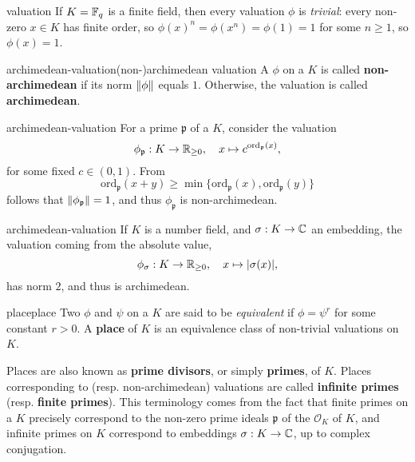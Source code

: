 \begin{example}{valuation}
    If $K = \mathbb{F}_q$ is a finite field, then every valuation $\phi$ is \textit{trivial}: every non-zero $x \in K$ has finite order, so $\phi(x)^n = \phi(x^n) = \phi(1) = 1$ for some $n \ge 1$, so $\phi(x) = 1$.
\end{example}

\begin{topic}{archimedean-valuation}{(non-)archimedean valuation}
    A  $\phi$ on a  $K$ is called \textbf{non-archimedean} if its norm $\left\|\phi\right\|$ equals $1$. Otherwise, the valuation is called \textbf{archimedean}.
\end{topic}

\begin{example}{archimedean-valuation}
    For a prime $\mathfrak{p}$ of a  $K$, consider the valuation
    \[ \phi_\mathfrak{p} : K \to \mathbb{R}_{\ge 0}, \quad x \mapsto c^{\text{ord}_\mathfrak{p}(x)} , \]
    for some fixed $c \in (0, 1)$. From
    \[ \text{ord}_\mathfrak{p}(x + y) \ge \min \{ \text{ord}_\mathfrak{p}(x), \text{ord}_\mathfrak{p}(y) \} \]
    follows that $\left\|\phi_\mathfrak{p}\right\| = 1$, and thus $\phi_\mathfrak{p}$ is non-archimedean.
\end{example}

\begin{example}{archimedean-valuation}
    If $K$ is a number field, and $\sigma : K \to \mathbb{C}$ an embedding, the valuation coming from the absolute value,
    \[ \phi_\sigma : K \to \mathbb{R}_{\ge 0}, \quad x \mapsto |\sigma(x)| , \]
    has norm $2$, and thus is archimedean.
\end{example}

\begin{topic}{place}{place}
    Two  $\phi$ and $\psi$ on a  $K$ are said to be \textit{equivalent} if $\phi = \psi^r$ for some constant $r > 0$. A \textbf{place} of $K$ is an equivalence class of non-trivial valuations on $K$.
    
    Places are also known as \textbf{prime divisors}, or simply \textbf{primes}, of $K$. Places corresponding to  (resp. non-archimedean) valuations are called \textbf{infinite primes} (resp. \textbf{finite primes}). This terminology comes from the fact that finite primes on a  $K$ precisely correspond to the non-zero prime ideals $\mathfrak{p}$ of the  $\mathcal{O}_K$ of $K$, and infinite primes on $K$ correspond to embeddings $\sigma : K \to \mathbb{C}$, up to complex conjugation.
\end{topic}

